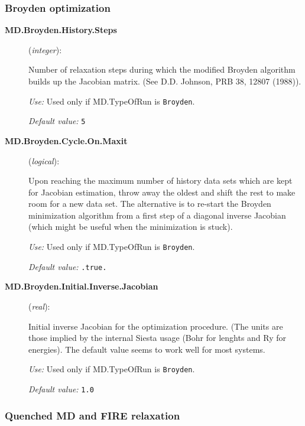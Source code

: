 \documentclass[11pt]{article}
\begin{document}
\subsubsection{Broyden optimization}
\begin{description}

\item [{\bf MD.Broyden.History.Steps}] ({\it integer}):

Number of relaxation steps during which the modified Broyden algorithm builds up
the Jacobian matrix. (See D.D. Johnson, PRB 38, 12807
(1988)).

{\it Use:} Used only if MD.TypeOfRun is {\tt Broyden}. 

{\it Default value:} {\tt 5}

\item [{\bf MD.Broyden.Cycle.On.Maxit}] ({\it logical}):

Upon reaching the maximum number of history data sets which are kept
for Jacobian estimation, throw away the oldest and shift the rest to
make room for a new data set. The alternative is to re-start the
Broyden minimization algorithm from a first step of a diagonal inverse
Jacobian (which might be useful when the minimization is
stuck). 

{\it Use:} Used only if MD.TypeOfRun is {\tt Broyden}. 

{\it Default value:} {\tt .true.}

\item[{\bf MD.Broyden.Initial.Inverse.Jacobian}] ({\it real}):

Initial inverse Jacobian for the optimization procedure. (The units 
are those implied by the internal Siesta usage (Bohr for lenghts and
Ry for energies). The default value seems to work well for most systems.

{\it Use:} Used only if MD.TypeOfRun is {\tt Broyden}. 

{\it Default value:} {\tt 1.0}

   
\end{description}

\subsubsection{Quenched MD and FIRE relaxation}
\end{document}
